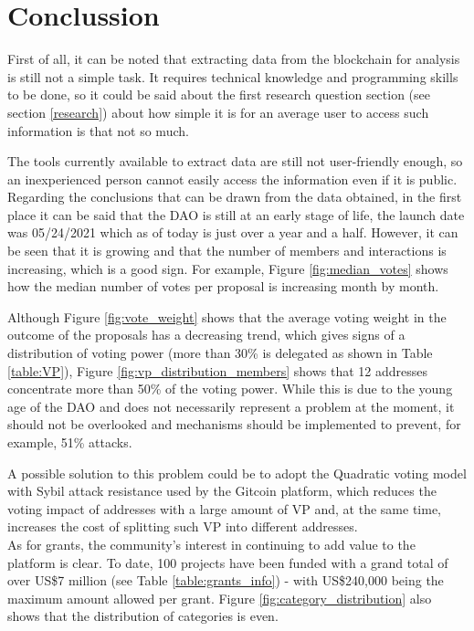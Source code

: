 \documentclass[MSE,Master,english]{twbook}%
\begin{document}
\chapter{Conclussion\label{conclussion}}
First of all, it can be noted that extracting data from the blockchain for analysis is still not a simple task. It requires technical knowledge and programming skills to be done, so it could be said about the first research question section (see section \ref{research}) about how simple it is for an average user to access such information is that not so much.

The tools currently available to extract data are still not user-friendly enough, so an inexperienced person cannot easily access the information even if it is public. \\

Regarding the conclusions that can be drawn from the data obtained, in the first place it can be said that the DAO is still at an early stage of life, the launch date was 05/24/2021 which as of today is just over a year and a half. However, it can be seen that it is growing and that the number of members and interactions is increasing, which is a good sign. For example, Figure \ref{fig:median_votes} shows how the median number of votes per proposal is increasing month by month.

Although Figure \ref{fig:vote_weight} shows that the average voting weight in the outcome of the proposals has a decreasing trend, which gives signs of a distribution of voting power (more than 30\% is delegated as shown in Table \ref{table:VP}), Figure \ref{fig:vp_distribution_members} shows that 12 addresses concentrate more than 50\% of the voting power. While this is due to the young age of the DAO and does not necessarily represent a problem at the moment, it should not be overlooked and mechanisms should be implemented to prevent, for example, 51\% attacks\cite{51PercentAttack}. 

A possible solution to this problem could be to adopt the Quadratic voting model with Sybil attack resistance used by the Gitcoin platform\cite{gitcoin}, which reduces the voting impact of addresses with a large amount of VP and, at the same time, increases the cost of splitting such VP into different addresses. \\

As for grants, the community's interest in continuing to add value to the platform is clear.  To date, 100 projects have been funded with a grand total of over US\$7 million (see Table \ref{table:grants_info}) - with US\$240,000 being the maximum amount allowed per grant. Figure \ref{fig:category_distribution} also shows that the distribution of categories is even.
\end{document}
